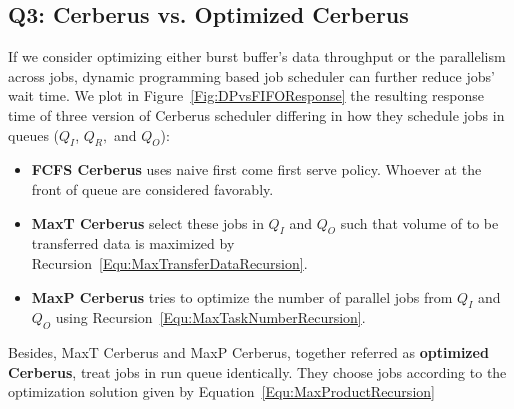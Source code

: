\subsection{Q3: Cerberus vs. Optimized Cerberus}
If we consider optimizing either burst buffer's data throughput or the parallelism across jobs,
dynamic programming based job scheduler can further reduce jobs' wait time.
We plot in Figure~\ref{Fig:DPvsFIFOResponse} the resulting response time of
three version of Cerberus scheduler differing in
how they schedule jobs in queues ($Q_I$, $Q_R,$ and $Q_O$):
\begin{itemize}
        \item \textbf{FCFS Cerberus} uses naive first come first serve policy.
                Whoever at the front of queue are considered favorably.
        \item \textbf{MaxT Cerberus} select these jobs in $Q_I$ and $Q_O$
                such that volume of to be transferred data
                is maximized by Recursion~\ref{Equ:MaxTransferDataRecursion}.
        \item \textbf{MaxP Cerberus} tries to optimize
                the number of parallel jobs from $Q_I$ and $Q_O$
                using Recursion~\ref{Equ:MaxTaskNumberRecursion}.
\end{itemize}
Besides, MaxT Cerberus and MaxP Cerberus, together referred as \textbf{optimized Cerberus},
treat jobs in run queue identically.
They choose jobs according to the optimization solution
given by Equation~\ref{Equ:MaxProductRecursion}

